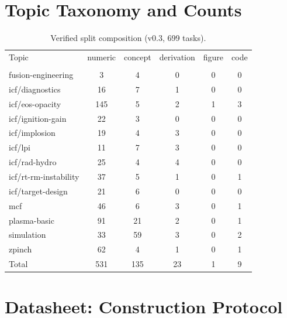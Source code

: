 \section{Topic Taxonomy and Counts}
\label{app:taxonomy}

\begin{table}[h]
\centering
\caption{Verified split composition (v0.3, 699 tasks).}
\label{tab:topics}
\small
\begin{tabular}{@{}lccccc@{}}
\toprule
Topic & numeric & concept & derivation & figure & code \\\\
\midrule
fusion-engineering & 3 & 4 & 0 & 0 & 0 \\
icf/diagnostics & 16 & 7 & 1 & 0 & 0 \\
icf/eos-opacity & 145 & 5 & 2 & 1 & 3 \\
icf/ignition-gain & 22 & 3 & 0 & 0 & 0 \\
icf/implosion & 19 & 4 & 3 & 0 & 0 \\
icf/lpi & 11 & 7 & 3 & 0 & 0 \\
icf/rad-hydro & 25 & 4 & 4 & 0 & 0 \\
icf/rt-rm-instability & 37 & 5 & 1 & 0 & 1 \\
icf/target-design & 21 & 6 & 0 & 0 & 0 \\
mcf & 46 & 6 & 3 & 0 & 1 \\
plasma-basic & 91 & 21 & 2 & 0 & 1 \\
simulation & 33 & 59 & 3 & 0 & 2 \\
zpinch & 62 & 4 & 1 & 0 & 1 \\
\midrule
Total & 531 & 135 & 23 & 1 & 9 \\
\bottomrule
\end{tabular}
\end{table}

\section{Datasheet: Construction Protocol}
\label{app:datasheet}

